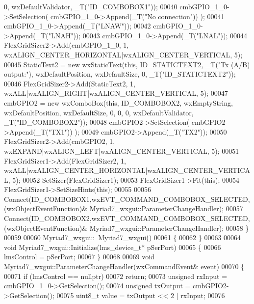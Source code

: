 \begin{DoxyCode}
       0, wxDefaultValidator, \_T(\textcolor{stringliteral}{"ID\_COMBOBOX1"}));
00040     cmbGPIO\_1\_0->SetSelection( cmbGPIO\_1\_0->Append(\_T(\textcolor{stringliteral}{"No connection"})) );
00041     cmbGPIO\_1\_0->Append(\_T(\textcolor{stringliteral}{"LNAW"}));
00042     cmbGPIO\_1\_0->Append(\_T(\textcolor{stringliteral}{"LNAH"}));
00043     cmbGPIO\_1\_0->Append(\_T(\textcolor{stringliteral}{"LNAL"}));
00044     FlexGridSizer2->Add(cmbGPIO\_1\_0, 1, wxALIGN\_CENTER\_HORIZONTAL|wxALIGN\_CENTER\_VERTICAL, 5);
00045     StaticText2 = \textcolor{keyword}{new} wxStaticText(\textcolor{keyword}{this}, ID\_STATICTEXT2, \_T(\textcolor{stringliteral}{"Tx (A/B) output:"}), wxDefaultPosition, 
      wxDefaultSize, 0, \_T(\textcolor{stringliteral}{"ID\_STATICTEXT2"}));
00046     FlexGridSizer2->Add(StaticText2, 1, wxALL|wxALIGN\_RIGHT|wxALIGN\_CENTER\_VERTICAL, 5);
00047     cmbGPIO2 = \textcolor{keyword}{new} wxComboBox(\textcolor{keyword}{this}, ID\_COMBOBOX2, wxEmptyString, wxDefaultPosition, wxDefaultSize, 0, 0, 0,
       wxDefaultValidator, \_T(\textcolor{stringliteral}{"ID\_COMBOBOX2"}));
00048     cmbGPIO2->SetSelection( cmbGPIO2->Append(\_T(\textcolor{stringliteral}{"TX1"})) );
00049     cmbGPIO2->Append(\_T(\textcolor{stringliteral}{"TX2"}));
00050     FlexGridSizer2->Add(cmbGPIO2, 1, wxEXPAND|wxALIGN\_LEFT|wxALIGN\_CENTER\_VERTICAL, 5);
00051     FlexGridSizer1->Add(FlexGridSizer2, 1, wxALL|wxALIGN\_CENTER\_HORIZONTAL|wxALIGN\_CENTER\_VERTICAL, 5);
00052     SetSizer(FlexGridSizer1);
00053     FlexGridSizer1->Fit(\textcolor{keyword}{this});
00054     FlexGridSizer1->SetSizeHints(\textcolor{keyword}{this});
00055 
00056     Connect(ID\_COMBOBOX1,wxEVT\_COMMAND\_COMBOBOX\_SELECTED,(wxObjectEventFunction)&
      Myriad7_wxgui::ParameterChangeHandler);
00057     Connect(ID\_COMBOBOX2,wxEVT\_COMMAND\_COMBOBOX\_SELECTED,(wxObjectEventFunction)&
      Myriad7\_wxgui::ParameterChangeHandler);
00058 \}
00059 
00060 Myriad7_wxgui::~Myriad7_wxgui()
00061 \{
00062 \}
00063 
00064 \textcolor{keywordtype}{void} Myriad7_wxgui::Initialize(lms_device_t* pSerPort)
00065 \{
00066     lmsControl = pSerPort;
00067 \}
00068 
00069 \textcolor{keywordtype}{void} Myriad7_wxgui::ParameterChangeHandler(wxCommandEvent& event)
00070 \{
00071     \textcolor{keywordflow}{if} (lmsControl == \textcolor{keyword}{nullptr})
00072         \textcolor{keywordflow}{return};
00073     \textcolor{keywordtype}{unsigned} rxInput = cmbGPIO\_1\_0->GetSelection();
00074     \textcolor{keywordtype}{unsigned} txOutput = cmbGPIO2->GetSelection();
00075     uint8\_t value = txOutput << 2 | rxInput;
00076 

\end{DoxyCode}
